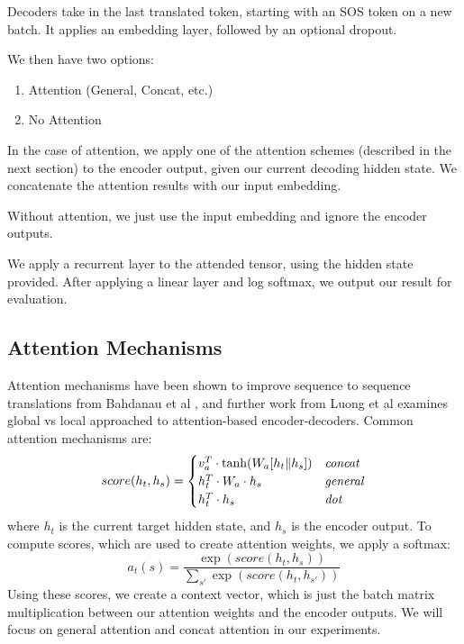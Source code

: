 \documentclass[twoside,twocolumn]{article}
\begin{document}
Decoders take in the last translated token, starting with an SOS token on a
new batch. It applies an embedding layer, followed by an optional dropout.

We then have two options:
\begin{enumerate}
  \item Attention (General, Concat, etc.)
  \item No Attention
\end{enumerate}
In the case of attention, we apply one of the attention schemes (described in
the next section) to the encoder output, given our current decoding
hidden state. We concatenate the attention results with our input embedding.

Without attention, we just use the input embedding and ignore the encoder
outputs.

We apply a recurrent layer to the attended tensor, using the hidden state
provided. After applying a linear layer and log softmax, we output our result
for evaluation.

\subsection{Attention Mechanisms}
Attention mechanisms have been shown to improve sequence to sequence
translations from Bahdanau et al \cite{bahdanau2014neural}, and further work
from Luong et al \cite{luong2015effective} examines global vs local approached
to attention-based encoder-decoders. Common attention mechanisms are:
\begin{equation}
    score(h_t, h_s) =
    \begin{cases}
        v_a^T \cdot \tanh (W_a [h_t \| h_s]) & \text{\emph{concat}} \\
        h_t^T \cdot W_a \cdot h_s & \text{\emph{general}} \\
        h_t^T \cdot h_s & \text{\emph{dot}} \\
    \end{cases}
\end{equation}
where $h_t$ is the current target hidden state, and $h_s$ is the encoder output.
To compute scores, which are used to create attention weights, we apply a
softmax:
\begin{equation}
  a_t(s) = \frac{\exp(score(h_t, h_s))}{\sum_{s'}\exp(score(h_t, h_{s'}))}
\end{equation}
Using these scores, we create a context vector, which is just the batch matrix
multiplication between our attention weights and the encoder outputs.
We will focus on general attention and concat attention in our
experiments.
\end{document}
